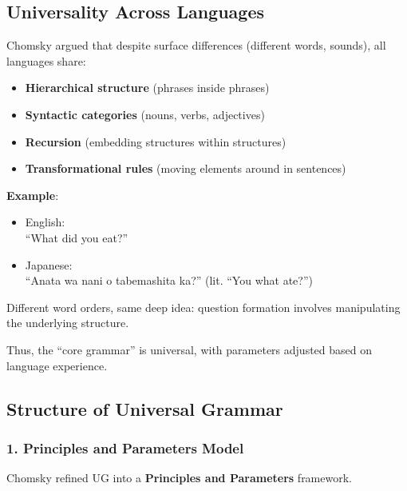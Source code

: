 \documentclass[12pt]{article}
\newcommand{\tightlist}{\itemsep 0pt\parskip 0pt\parsep 0pt}
\begin{document}
\hypertarget{universality-across-languages}{%
\subsection{Universality Across
Languages}\label{universality-across-languages}}

Chomsky argued that despite surface differences (different words,
sounds), all languages share:

\begin{itemize}
\tightlist
\item
  \textbf{Hierarchical structure} (phrases inside phrases)
\item
  \textbf{Syntactic categories} (nouns, verbs, adjectives)
\item
  \textbf{Recursion} (embedding structures within structures)
\item
  \textbf{Transformational rules} (moving elements around in sentences)
\end{itemize}

\textbf{Example}:

\begin{itemize}
\tightlist
\item
  English:\\
  ``What did you eat?''
\item
  Japanese:\\
  ``Anata wa nani o tabemashita ka?'' (lit. ``You what ate?'')
\end{itemize}

Different word orders, same deep idea: question formation involves
manipulating the underlying structure.

Thus, the ``core grammar'' is universal, with parameters adjusted based
on language experience.

\hypertarget{structure-of-universal-grammar}{%
\subsection{Structure of Universal
Grammar}\label{structure-of-universal-grammar}}

\hypertarget{principles-and-parameters-model}{%
\subsubsection{1. Principles and Parameters
Model}\label{principles-and-parameters-model}}

Chomsky refined UG into a \textbf{Principles and Parameters} framework.
\end{document}
